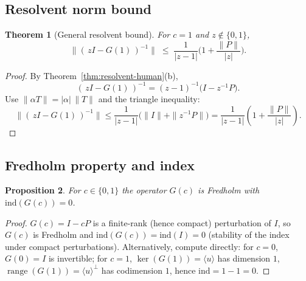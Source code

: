 \documentclass[11pt]{article}
\newtheorem{theorem}{Theorem}[section]
\newtheorem{proposition}[theorem]{Proposition}
\theoremstyle{definition}
\DeclareMathOperator{\range}{range}
\DeclareMathOperator{\kerop}{ker}
\begin{document}
\subsection{Resolvent norm bound}

\begin{theorem}[General resolvent bound]\label{thm:bound-human}
For $c=1$ and $z\notin\{0,1\}$,
\[
\big\|(\,zI - G(1)\,)^{-1}\big\| \;\le\; \frac{1}{|z-1|}\Big(1 + \frac{\|P\|}{|z|}\Big).
\]
\end{theorem}

\begin{proof}
By Theorem~\ref{thm:resolvent-human}(b),
\[
(\,zI - G(1)\,)^{-1}=(z-1)^{-1}\big(I - z^{-1}P\big).
\]
Use $\| \alpha T\|=|\alpha|\,\|T\|$ and the triangle inequality:
\[
\big\|(\,zI - G(1)\,)^{-1}\big\|
\le \frac{1}{|z-1|}\big(\|I\| + \|z^{-1}P\|\big)
= \frac{1}{|z-1|}\left(1+\frac{\|P\|}{|z|}\right).
\]
\end{proof}

\subsection{Fredholm property and index}

\begin{proposition}\label{prop:fredholm}
For $c\in\{0,1\}$ the operator $G(c)$ is Fredholm with $\mathrm{ind}(G(c))=0$.
\end{proposition}

\begin{proof}
$G(c)=I-cP$ is a finite-rank (hence compact) perturbation of $I$, so $G(c)$ is Fredholm and $\mathrm{ind}(G(c))=\mathrm{ind}(I)=0$ (stability of the index under compact perturbations). Alternatively, compute directly: for $c=0$, $G(0)=I$ is invertible; for $c=1$, $\kerop(G(1))=\langle u\rangle$ has dimension $1$, $\range(G(1))=\langle u\rangle^\perp$ has codimension $1$, hence $\mathrm{ind}=1-1=0$.
\end{proof}
\end{document}
